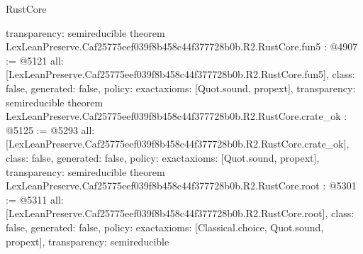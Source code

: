 \begin{lexlean}{RustCore}
\begin{coremodule}
{  transparency: semireducible
}
theorem LexLeanPreserve.Caf25775eef039f8b458c44f377728b0b.R2.RustCore.fun5 : @4907 := @5121 {
  all: [LexLeanPreserve.Caf25775eef039f8b458c44f377728b0b.R2.RustCore.fun5],
  class: false,
  generated: false,
  policy: exact{axioms: [Quot.sound, propext]},
  transparency: semireducible
}
theorem LexLeanPreserve.Caf25775eef039f8b458c44f377728b0b.R2.RustCore.crate_ok : @5125 := @5293 {
  all: [LexLeanPreserve.Caf25775eef039f8b458c44f377728b0b.R2.RustCore.crate_ok],
  class: false,
  generated: false,
  policy: exact{axioms: [Quot.sound, propext]},
  transparency: semireducible
}
theorem LexLeanPreserve.Caf25775eef039f8b458c44f377728b0b.R2.RustCore.root : @5301 := @5311 {
  all: [LexLeanPreserve.Caf25775eef039f8b458c44f377728b0b.R2.RustCore.root],
  class: false,
  generated: false,
  policy: exact{axioms: [Classical.choice, Quot.sound, propext]},
  transparency: semireducible
}


\end{coremodule}
\end{lexlean}
